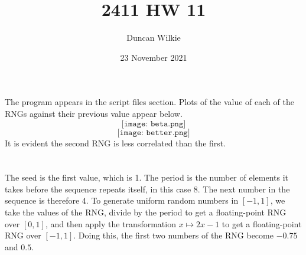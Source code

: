 \documentclass{article}
\title{2411 HW 11}
\author{Duncan Wilkie}
\date{23 November 2021}
\begin{document}
\maketitle

\section{}
The program appears in the script files section. Plots of the value of each of the RNGs against their previous value appear below.
\[\texttt{[image: beta.png]}\]
\[\texttt{[image: better.png]}\]
It is evident the second RNG is less correlated than the first.

\section{}
The seed is the first value, which is 1. The period is the number of elements it takes before the sequence repeats itself, in this case 8. The next number in the sequence is therefore 4. To generate uniform random numbers in $[-1,1]$, we take the values of the RNG, divide by the period to get a floating-point RNG over $[0,1]$, and then apply the transformation $x\mapsto 2x-1$ to get a floating-point RNG over $[-1,1]$. Doing this, the first two numbers of the RNG become $-0.75$ and $0.5$.
\end{document}

